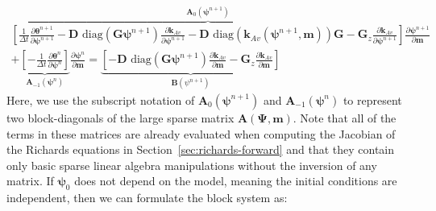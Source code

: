 \documentclass[preprint,review,3p,times,onecolumn,authoryear]{elsarticle}
\newcommand{\bfA}{\mathbf{A}}
\newcommand{\bfm}{\mathbf{m}}
\newcommand{\bfpsi}{\boldsymbol{\psi}}
\newcommand{\bfPsi}{\boldsymbol{\Psi}}
\newcommand{\nn}{^{n+1}}
\newcommand{\n}{^{n}}
\begin{document}
\begin{align}
\label{eq:richards-timestep-deriv-blocks}
\overbrace{
    \left[
        \frac{1}{\Delta t}
        \frac{\partial \boldsymbol{\theta}^{n+1}}{\partial\boldsymbol{\psi}^{n+1}}
        -\mathbf{D}
        \text{ diag}\left( \mathbf{G} \boldsymbol{\psi}^{n+1} \right)
        \frac{\partial \mathbf{k}_{Av}}{\partial\boldsymbol{\psi}^{n+1}}
        -\mathbf{D}
        \text{ diag}\left( \mathbf{k}_{Av}(\boldsymbol{\psi}^{n+1},\mathbf{m}) \right)
        \mathbf{G}
        - \mathbf{G}_{z}
        \frac{\partial \mathbf{k}_{Av}}{\partial\boldsymbol{\psi}^{n+1}}
    \right]
}^{\mathbf{A}_0(\boldsymbol{\psi}^{n+1})}
\frac{\partial \boldsymbol{\psi}^{n+1}}{\partial\mathbf{m}}
\nonumber\\
+
\underbrace{
    \left[
        -\frac{1}{\Delta t}
        \frac{\partial \boldsymbol{\theta}^n}{\partial\boldsymbol{\psi}^n}
    \right]
}_{\mathbf{A}_{-1}(\boldsymbol{\psi}^n)}
\frac{\partial \boldsymbol{\psi}^n}{\partial\mathbf{m}}
=
\underbrace{
\left[
    -\mathbf{D}
    \text{ diag}\left( \mathbf{G} \boldsymbol{\psi}^{n+1} \right)
    \frac{\partial \mathbf{k}_{Av}}{\partial\mathbf{m}}
    -\mathbf{G}_{z}
    \frac{\partial \mathbf{k}_{Av}}{\partial\mathbf{m}}
\right]
}_{\mathbf{B}(\psi^{n+1})}&
\end{align}
Here, we use the subscript notation of $\bfA_0(\bfpsi\nn)$ and $\bfA_{-1}(\bfpsi\n)$ to represent two block-diagonals of the large sparse matrix $\bfA({\bfPsi},\bfm)$. Note that all of the terms in these matrices are already evaluated when computing the Jacobian of the Richards equations in Section~\ref{sec:richards-forward} and that they contain only basic sparse linear algebra manipulations without the inversion of any matrix. If $\bfpsi_0$ does not depend on the model, meaning the initial conditions are independent, then we can formulate the block system as:
\end{document}
